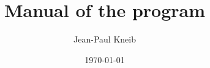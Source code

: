 \documentclass[11pt]{book}
\title{ Manual of the \lenstool program \\}
\author{Jean-Paul Kneib\\}
\date{\today}
\begin{document}
\newcommand{\be}{\begin{equation}}
\newcommand{\ee}{\end{equation}}
\frenchspacing

\maketitle
\tableofcontents





 
\end{document}
